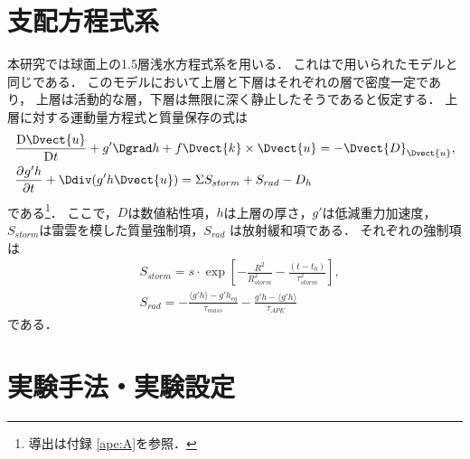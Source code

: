 \documentclass[a4j,12pt,openbib,oneside]{jreport}
\def\DD#1#2{\frac{\mathrm D #1}{\mathrm D #2}}
\renewcommand{\DP}[3][]{\frac{\partial^{#1} #2}{\partial #3^{#1}}}
\begin{document}
\section{支配方程式系}
\label{sec:model1}
本研究では球面上の1.5層浅水方程式系を用いる．
これは\cite{Showman2007}で用いられたモデルと同じである．
このモデルにおいて上層と下層はそれぞれの層で密度一定であり，
上層は活動的な層，下層は無限に深く静止したそうであると仮定する．
上層に対する運動量方程式と質量保存の式は
%
\begin{align}
& \DD{\Dvect{u}}{t}+ g' \Dgrad h + f \Dvect{k} \times \Dvect{u} = -\Dvect{D}_{\Dvect{u}},  \label{eq:eq1} \\
& \DP{g'h}{t} + \Ddiv (g'h\Dvect{u}) = \Sigma S_{storm} + S_{rad} - D_h \label{eq:eq2} 
\end{align}
%
である\footnote{導出は付録 \ref{ape:A}を参照．}．
ここで，$D$は数値粘性項，$h$は上層の厚さ，$g'$は低減重力加速度，
 $S_{storm}$は雷雲を模した質量強制項，$S_{rad}$ は放射緩和項である．
それぞれの強制項は
\begin{align}
&S_{storm} = s \cdot \exp \left [- \frac{R^2}{R_{storm}^2} - \frac{(t-t_0)}{\tau_{storm}^2} \right ], \label{eq:eq3}\\
&S_{rad}  = - \frac{\langle g'h \rangle - g'h_{eq}}{\tau_{mass}} - \frac{g'h - \langle g'h \rangle}{\tau_{APE}} \label{eq:eq4}
\end{align}
である．
%


\section{実験手法・実験設定}
\label{sec:model2}

\clearpage
\setcounter{table}{0}
\setcounter{figure}{0}
\end{document}
